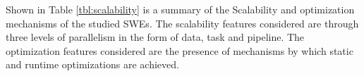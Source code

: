 Shown in Table \ref{tbl:scalability} is a summary of the Scalability and
optimization mechanisms of the studied SWEs. The scalability features
considered are through three levels of parallelism in the form of data,
task and pipeline. The optimization features considered are the presence of
mechanisms by which static and runtime optimizations are achieved.

